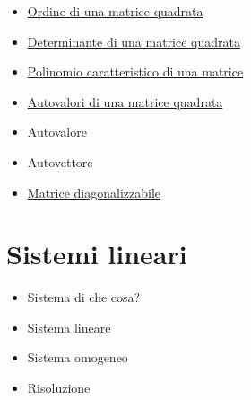 \documentclass[a4paper,10pt]{article}
\begin{document}
\begin{itemize}
   \item \href{OrdineMatrice.html}{Ordine di una matrice quadrata}
   \item \href{DeterminanteMatrice.html}{Determinante di una matrice quadrata}
   \item \href{PolinomioMatrice.html}{Polinomio caratteristico di una matrice}
   \item \href{AutovaloriMatrice.html}{Autovalori di una matrice quadrata}
   \item Autovalore
   \item Autovettore
   \item \href{MatriceDiagonalizzabile.html}{Matrice diagonalizzabile}
\end{itemize}

\section{Sistemi lineari}
  \begin{itemize}
   \item Sistema di che cosa?
   \item Sistema lineare
   \item Sistema omogeneo
   \item Risoluzione
  \end{itemize}
\end{document}
